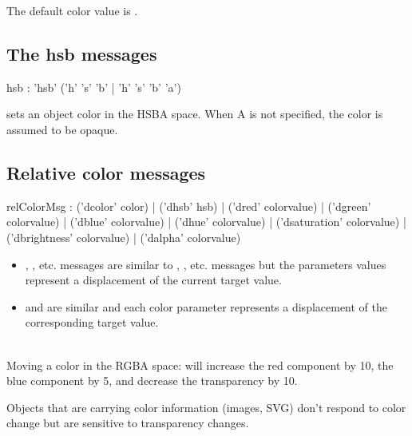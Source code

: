 \documentclass[a4paper,twoside]{report}
\newcommand{\subsublevel}[1]	{\subsection{#1}}
\newcommand{\sampleindent}	{ \hspace{0.5cm} }
\begin{document}
The default color value is .


\subsublevel{The hsb messages}
\label{hsbmsg}


\begin{rail}
hsb :		'hsb' ('h' 's' 'b' | 'h' 's' 'b' 'a') 
\end{rail}

 sets an object color in the HSBA space. 
When A is not specified, the color is assumed to be opaque. 



\subsublevel{Relative color messages}
\label{relcolormsg}


\begin{rail}
relColorMsg :  
		 	('dcolor' color) 
		| 	('dhsb' hsb) 
		| 	('dred' colorvalue) 
		| 	('dgreen' colorvalue) 
		| 	('dblue' colorvalue) 
		| 	('dhue' colorvalue) 
		| 	('dsaturation' colorvalue) 
		| 	('dbrightness' colorvalue) 
		| 	('dalpha' colorvalue) 
\end{rail}

\begin{itemize}
\item {}, , etc. messages are similar to , , etc. messages but the parameters values represent a displacement of the current target value.
\item {} and  are similar and each color parameter represents a displacement of the corresponding target value.
\end{itemize}

\example \\
Moving a color in the RGBA space:
\sampleindent will increase the red component by 10, the blue component by 5, and decrease the transparency by 10.

\note{} Objects that are carrying color information (images, SVG) don't respond to color change but are sensitive to transparency changes.
\end{document}
